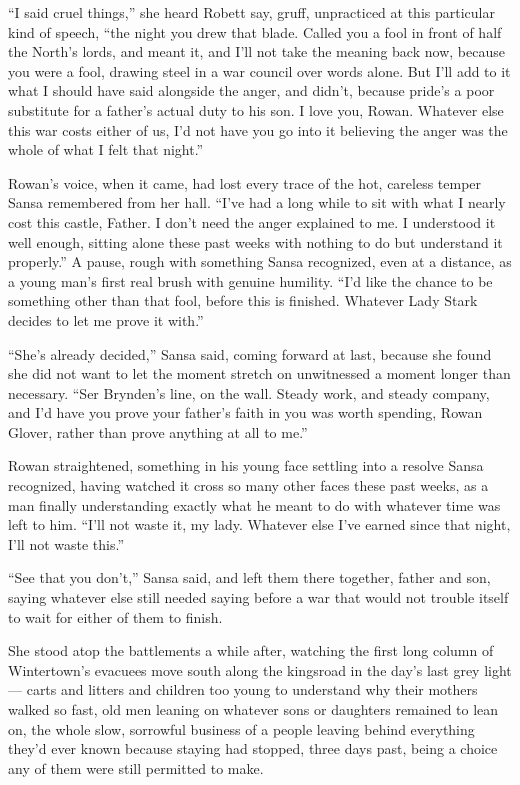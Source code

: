 “I said cruel things,” she heard Robett say, gruff, unpracticed at this particular kind of speech, “the night you drew that blade. Called you a fool in front of half the North’s lords, and meant it, and I’ll not take the meaning back now, because you were a fool, drawing steel in a war council over words alone. But I’ll add to it what I should have said alongside the anger, and didn’t, because pride’s a poor substitute for a father’s actual duty to his son. I love you, Rowan. Whatever else this war costs either of us, I’d not have you go into it believing the anger was the whole of what I felt that night.”

Rowan’s voice, when it came, had lost every trace of the hot, careless temper Sansa remembered from her hall. “I’ve had a long while to sit with what I nearly cost this castle, Father. I don’t need the anger explained to me. I understood it well enough, sitting alone these past weeks with nothing to do but understand it properly.” A pause, rough with something Sansa recognized, even at a distance, as a young man’s first real brush with genuine humility. “I’d like the chance to be something other than that fool, before this is finished. Whatever Lady Stark decides to let me prove it with.”

“She’s already decided,” Sansa said, coming forward at last, because she found she did not want to let the moment stretch on unwitnessed a moment longer than necessary. “Ser Brynden’s line, on the wall. Steady work, and steady company, and I’d have you prove your father’s faith in you was worth spending, Rowan Glover, rather than prove anything at all to me.”

Rowan straightened, something in his young face settling into a resolve Sansa recognized, having watched it cross so many other faces these past weeks, as a man finally understanding exactly what he meant to do with whatever time was left to him. “I’ll not waste it, my lady. Whatever else I’ve earned since that night, I’ll not waste this.”

“See that you don’t,” Sansa said, and left them there together, father and son, saying whatever else still needed saying before a war that would not trouble itself to wait for either of them to finish.

\sceneBreak

She stood atop the battlements a while after, watching the first long column of Wintertown’s evacuees move south along the kingsroad in the day’s last grey light — carts and litters and children too young to understand why their mothers walked so fast, old men leaning on whatever sons or daughters remained to lean on, the whole slow, sorrowful business of a people leaving behind everything they’d ever known because staying had stopped, three days past, being a choice any of them were still permitted to make.

